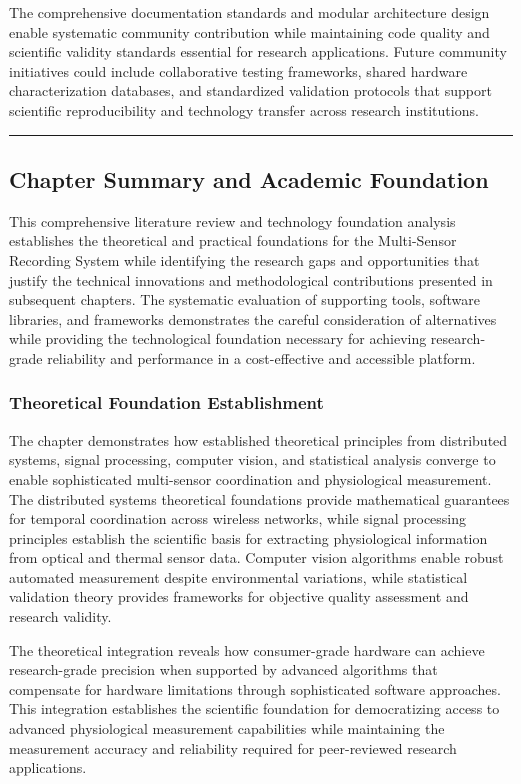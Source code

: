 \documentclass[11pt,a4paper]{article}
\begin{document}
The comprehensive documentation standards and modular architecture design enable systematic community contribution while
maintaining code quality and scientific validity standards essential for research applications. Future community
initiatives could include collaborative testing frameworks, shared hardware characterization databases, and standardized
validation protocols that support scientific reproducibility and technology transfer across research institutions.

\hrule

\subsection{Chapter Summary and Academic Foundation}

This comprehensive literature review and technology foundation analysis establishes the theoretical and practical
foundations for the Multi-Sensor Recording System while identifying the research gaps and opportunities that justify the
technical innovations and methodological contributions presented in subsequent chapters. The systematic evaluation of
supporting tools, software libraries, and frameworks demonstrates the careful consideration of alternatives while
providing the technological foundation necessary for achieving research-grade reliability and performance in a
cost-effective and accessible platform.

\subsubsection{Theoretical Foundation Establishment}

The chapter demonstrates how established theoretical principles from distributed systems, signal processing, computer
vision, and statistical analysis converge to enable sophisticated multi-sensor coordination and physiological
measurement. The distributed systems theoretical foundations provide mathematical guarantees for temporal coordination
across wireless networks, while signal processing principles establish the scientific basis for extracting physiological
information from optical and thermal sensor data. Computer vision algorithms enable robust automated measurement despite
environmental variations, while statistical validation theory provides frameworks for objective quality assessment and
research validity.

The theoretical integration reveals how consumer-grade hardware can achieve research-grade precision when supported by
advanced algorithms that compensate for hardware limitations through sophisticated software approaches. This integration
establishes the scientific foundation for democratizing access to advanced physiological measurement capabilities while
maintaining the measurement accuracy and reliability required for peer-reviewed research applications.
\end{document}
